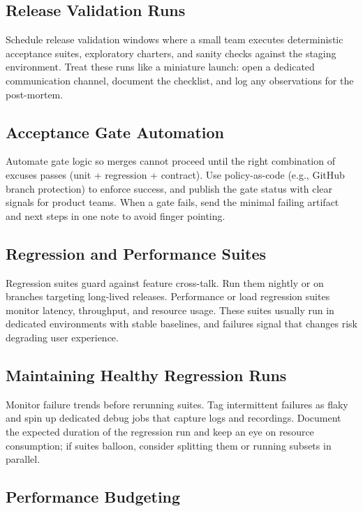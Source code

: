 \subsection{Release Validation Runs}

Schedule release validation windows where a small team executes deterministic acceptance suites, exploratory charters, and sanity checks against the staging environment. Treat these runs like a miniature launch: open a dedicated communication channel, document the checklist, and log any observations for the post-mortem.

\subsection{Acceptance Gate Automation}

Automate gate logic so merges cannot proceed until the right combination of excuses passes (unit + regression + contract). Use policy-as-code (e.g., GitHub branch protection) to enforce success, and publish the gate status with clear signals for product teams. When a gate fails, send the minimal failing artifact and next steps in one note to avoid finger pointing.

\subsection{Regression and Performance Suites}

Regression suites guard against feature cross-talk. Run them nightly or on branches targeting long-lived releases. Performance or load regression suites monitor latency, throughput, and resource usage. These suites usually run in dedicated environments with stable baselines, and failures signal that changes risk degrading user experience.

\subsection{Maintaining Healthy Regression Runs}

Monitor failure trends before rerunning suites. Tag intermittent failures as flaky and spin up dedicated debug jobs that capture logs and recordings. Document the expected duration of the regression run and keep an eye on resource consumption; if suites balloon, consider splitting them or running subsets in parallel.

\subsection{Performance Budgeting}

